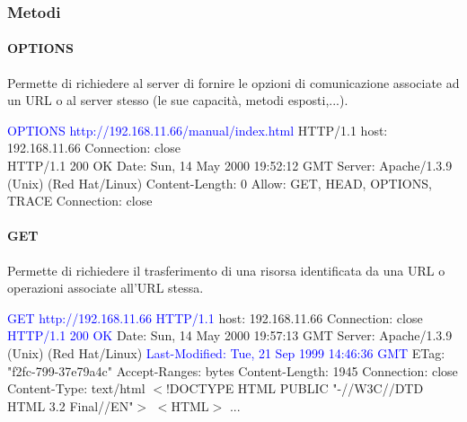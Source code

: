 \subsubsection{Metodi}
\paragraph{OPTIONS} Permette di richiedere al server di fornire le opzioni di comunicazione associate ad un URL o al server stesso (le sue capacità, metodi esposti,...).
\begin{mdframed}
    \textcolor{blue}{OPTIONS http://192.168.11.66/manual/index.html}\newline
    HTTP/1.1\newline
    host: 192.168.11.66\newline
    Connection: close\newline
    \\
    HTTP/1.1 200 OK\newline
    Date: Sun, 14 May 2000 19:52:12 GMT\newline
    Server: Apache/1.3.9 (Unix) (Red Hat/Linux)\newline
    Content-Length: 0\newline
    Allow: GET, HEAD, OPTIONS, TRACE\newline
    Connection: close
\end{mdframed}

\paragraph{GET} Permette di richiedere il trasferimento di una risorsa identificata da una URL o operazioni associate all’URL stessa.
\begin{mdframed}
    \textcolor{blue}{GET http://192.168.11.66 HTTP/1.1}\newline
    host: 192.168.11.66\newline
    Connection: close\newline
    \\
    \textcolor{blue}{HTTP/1.1 200 OK}\newline
    Date: Sun, 14 May 2000 19:57:13 GMT\newline
    Server: Apache/1.3.9 (Unix) (Red Hat/Linux)\newline
    \textcolor{blue}{Last-Modified: Tue, 21 Sep 1999 14:46:36 GMT}\newline
    ETag: "f2fc-799-37e79a4c"\newline
    Accept-Ranges: bytes\newline
    Content-Length: 1945\newline
    Connection: close\newline
    Content-Type: text/html\newline
    $<$!DOCTYPE HTML PUBLIC "-//W3C//DTD HTML 3.2 Final//EN"$>$\newline
    $<$HTML$>$ ...
\end{mdframed}

